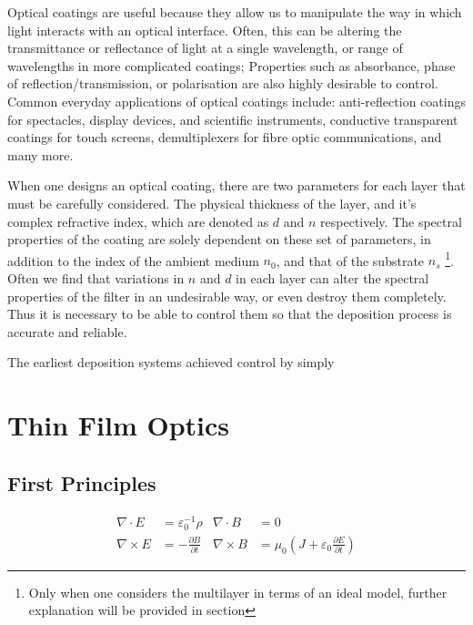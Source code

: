 \documentclass[10pt,a4paper,portrait]{report}
\begin{document}
\noindent
Optical coatings are useful because they allow us to manipulate the way in which light interacts with an optical interface.
Often, this can be altering the transmittance or reflectance of light at a single wavelength, or range of wavelengths in more complicated coatings;
Properties such as absorbance, phase of reflection/transmission, or 
polarisation are also highly desirable to control.
Common everyday applications of optical coatings include: anti-reflection coatings for spectacles, display devices, and scientific instruments, conductive transparent coatings for touch screens, demultiplexers for fibre optic communications, and many more.\newline

\noindent
When one designs an optical coating, there are two parameters for each layer that must be carefully considered.
The physical thickness of the layer, and  it's complex refractive index, which are denoted as $d$ and $n$ respectively.
The spectral properties of the coating are solely dependent on these set of parameters, in addition to the index of the ambient medium $n_0$, and that of the substrate $n_s$ \footnote{Only when one considers the multilayer in terms of an ideal model, further explanation will be provided in section}.
Often we find that variations in $n$ and $d$ in each layer can alter the spectral properties of the filter in an undesirable way, or even destroy them completely.
Thus it is necessary to be able to control them so that the deposition process is accurate and reliable. \newline

The earliest deposition systems achieved control by simply 


\section{Thin Film Optics}
\label{sec:thin film optics}

\subsection{First Principles}

\begin{equation}
\begin{aligned}
\nabla \cdot E &= \varepsilon^{-1}_{0}\rho &
\nabla \cdot B &= 0 \\
\nabla \times E &= -\frac{\partial B}{\partial t} &
\nabla \times B &= \mu_0 \left( J + \varepsilon_0 \frac{\partial E}{\partial t} \right)
\end{aligned}
\end{equation}
\end{document}
